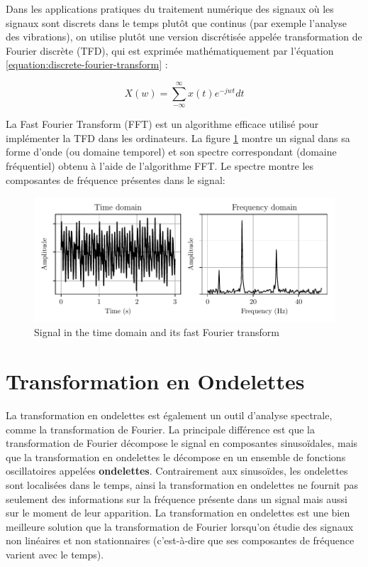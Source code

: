 Dans les applications pratiques du traitement numérique des signaux où les signaux sont discrets dans le temps plutôt que continus (par exemple l'analyse des vibrations), on utilise plutôt une version discrétisée appelée transformation de Fourier discrète (TFD), qui est exprimée mathématiquement par l'équation \ref{equation:discrete-fourier-transform} :

\begin{equation}
    X(w) = \sum_{-\infty}^{\infty}x(t)e^{-jwt}dt
    \label{equation:discrete-fourier-transform}
\end{equation}

La Fast Fourier Transform (FFT) est un algorithme efficace utilisé pour implémenter la TFD dans les ordinateurs. La figure \ref{figure:fft} montre un signal dans sa forme d'onde (ou domaine temporel) et son spectre correspondant (domaine fréquentiel) obtenu à l'aide de l'algorithme FFT. Le spectre montre les composantes de fréquence présentes dans le signal:

\begin{figure}[H]
    \centering
    \includegraphics{figures/fft.pdf}
    \caption{Signal in the time domain and its fast Fourier transform}
    \label{figure:fft}
\end{figure}


\section{Transformation en Ondelettes}
La transformation en ondelettes est également un outil d'analyse spectrale, comme la transformation de Fourier. La principale différence est que la transformation de Fourier décompose le signal en composantes sinusoïdales, mais que la transformation en ondelettes le décompose en un ensemble de fonctions oscillatoires appelées \textbf{ondelettes}. Contrairement aux sinusoïdes, les ondelettes sont localisées dans le temps, ainsi la transformation en ondelettes ne fournit pas seulement des informations sur la fréquence présente dans un signal mais aussi sur le moment de leur apparition. La transformation en ondelettes est une bien meilleure solution que la transformation de Fourier lorsqu'on étudie des signaux non linéaires et non stationnaires (c'est-à-dire que ses composantes de fréquence varient avec le temps).

